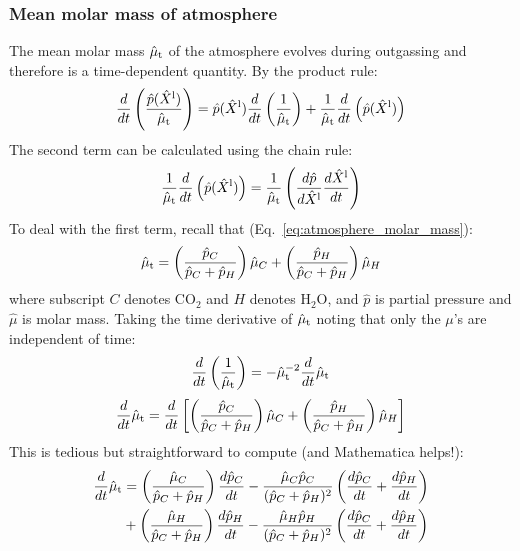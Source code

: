 \subsubsection{Mean molar mass of atmosphere}
The mean molar mass $\hat{\mu}_{\rm t}$ of the atmosphere evolves during outgassing and therefore is a time-dependent quantity.  By the product rule:
\begin{equation}
\frac{d}{dt} \left( \frac{\hat{p}(\hat{X}^{\rm l})}{\hat{\mu}_{\rm t}} \right) = \hat{p}(\hat{X}^{\rm l}) \frac{d}{dt} \left( \frac{1}{\hat{\mu}_{\rm t}} \right) + \frac{1}{\hat{\mu}_{\rm t}} \frac{d}{dt} \left( \hat{p}(\hat{X}^{\rm l}) \right)
\label{eq:atmos_evo}
\end{equation}
The second term can be calculated using the chain rule:
\begin{equation}
\frac{1}{\hat{\mu}_{\rm t}} \frac{d}{dt} \left( \hat{p}(\hat{X}^{\rm l}) \right) = \frac{1}{\hat{\mu}_{\rm t}} \left( \frac{d \hat{p}}{d \hat{X}^{\rm l}} \frac{d \hat{X}^{\rm l}}{d t} \right)
\end{equation}
To deal with the first term, recall that (Eq.~\ref{eq:atmosphere_molar_mass}):
\begin{equation}
\hat{\mu}_{\rm t} = \left( \frac{\hat{p}_C}{\hat{p}_C+\hat{p}_H} \right) \hat{\mu}_C + \left( \frac{\hat{p}_H}{\hat{p}_C+\hat{p}_H} \right) \hat{\mu}_H
\end{equation}
where subscript $C$ denotes CO$_2$ and $H$ denotes H$_2$O, and $\hat{p}$ is partial pressure and $\hat{\mu}$ is molar mass.  Taking the time derivative of $\hat{\mu}_{\rm t}$ noting that only the $\mu$'s are independent of time:
\begin{equation}
\frac{d}{dt} \left( \frac{1}{\hat{\mu}_{\rm t}} \right) = -\hat{\mu}_{\rm t}^{-2} \frac{d}{dt} \hat{\mu}_{\rm t}
\end{equation}
\begin{equation}
\frac{d}{dt} \hat{\mu}_{\rm t} = \frac{d}{dt} \left[ \left( \frac{\hat{p}_C}{\hat{p}_C+\hat{p}_H} \right) \hat{\mu}_C + \left( \frac{\hat{p}_H}{\hat{p}_C+\hat{p}_H} \right) \hat{\mu}_H \right]
\end{equation}
This is tedious but straightforward to compute (and Mathematica helps!):
\begin{align}
\frac{d}{dt} \hat{\mu}_{\rm t} &= \left( \frac{\hat{\mu}_C}{\hat{p}_C+\hat{p}_H} \right) \frac{d\hat{p}_C}{dt} - \frac{\hat{\mu}_C \hat{p}_C}{(\hat{p}_C+\hat{p}_H)^2} \left( \frac{d\hat{p}_C}{dt}+\frac{d\hat{p}_H}{dt} \right)\\
&+ \left( \frac{\hat{\mu}_H}{\hat{p}_C+\hat{p}_H} \right) \frac{d\hat{p}_H}{dt} - \frac{\hat{\mu}_H \hat{p}_H}{(\hat{p}_C+\hat{p}_H)^2} \left( \frac{d\hat{p}_C}{dt}+\frac{d\hat{p}_H}{dt} \right)
\end{align}
